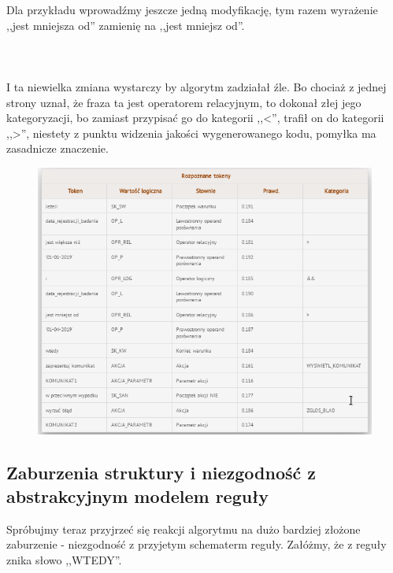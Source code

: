 Dla przykładu wprowadźmy jeszcze jedną modyfikację, tym razem wyrażenie ,,jest mniejsza od'' zamienię na  ,,jest mniejsz od''.
\\ \\
\\ \\

I ta niewielka zmiana wystarczy by algorytm zadziałał źle. Bo chociaż z jednej strony uznał, że fraza ta jest operatorem relacyjnym, to dokonał złej jego kategoryzacji, bo zamiast przypisać go do kategorii ,,<'', trafił on do kategorii ,,>'', niestety z punktu widzenia jakości wygenerowanego kodu, pomyłka ma zasadnicze znaczenie.
\begin{figure}[H]
	\centering
	\includegraphics[scale=0.8]{img/app-eksperymenty/p5-2.png}
\end{figure}

\subsection{Zaburzenia struktury i niezgodność z abstrakcyjnym modelem reguły}
Spróbujmy teraz przyjrzeć się reakcji algorytmu na dużo bardziej złożone zaburzenie - niezgodność z przyjetym schematerm reguły. Załóżmy, że z reguły znika słowo ,,WTEDY''.
\\ \\
\\ \\

